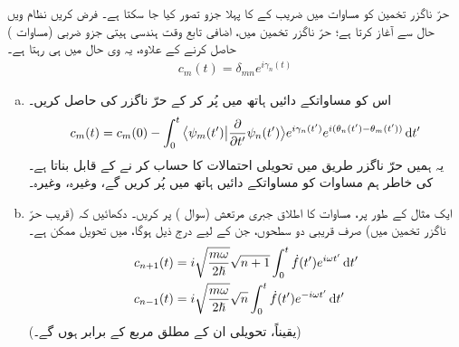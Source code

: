 حرّ ناگزر تخمین کو مساوات  میں  ضریب   کے  کا پہلا جزو تصور کیا جا سکتا ہے۔ فرض کریں نظام  ویں حال سے آغاز کرتا ہے؛ حرّ ناگزر تخمین میں، اضافی تابع وقت ہندسی ہیتی جزو ضربی (مساوات ) حاصل کرنے کے علاوہ، یہ  وی حال میں ہی رہتا ہے۔
\begin{align*} 
c_m (t) = \delta_{mn} e^{i \gamma_n (t)}
\end{align*} 
\begin{enumerate}[a.]
\item
اس کو مساواتکے دائیں ہاتھ میں پُر کر کے حرّ ناگزر کی  حاصل کریں۔
\begin{align}\label{مساوات_حر_آخری_سوال}
c_m (t) = c_m (0) - \int_0^t \big\langle \psi_m (t') \big | \frac{\partial}{\partial t'} \psi_n (t') \big \rangle e^{i \gamma_n (t')} e^{i (\theta_n (t') - \theta_m (t'))} \dif t'
\end{align}
یہ ہمیں  حرّ ناگزر طریق میں تحویلی احتمالات کا حساب کر نے کے قابل بناتا ہے۔ کی خاطر ہم مساوات کو مساواتکے دائیں ہاتھ میں پُر کریں گے، وغیرہ، وغیرہ۔ 
\item
ایک مثال کے طور پر، مساوات کا اطلاق جبری مرتعش (سوال ) پر کریں۔ دکھائیں کہ (قریب حرّ ناگزر تخمین میں) صرف قریبی دو سطحوں، جن کے لیے درج ذیل ہوگا، میں تحویل ممکن ہے۔ 
\begin{align*}
c_{n + 1} (t)& = i \sqrt{\frac{m \omega}{2 \hslash}} \sqrt{n + 1} \int_0^t \dot{f} (t') e^{i \omega t'} \dif t' \\
c_{n - 1} (t) &= i \sqrt{\frac{m \omega}{2 \hslash}} \sqrt{n} \int_0^t \dot{f} (t') e^{-i \omega t'} \dif t'
\end{align*}
(یقیناً، تحویلی  ان کے مطلق مربع کے برابر ہوں گے۔) 
\end{enumerate}

